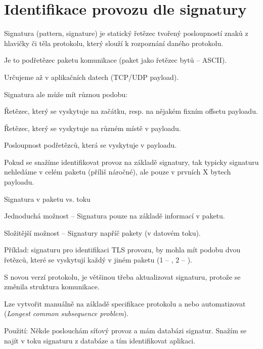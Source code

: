 
\section{Identifikace provozu dle signatury}


\begin{compactitem}
    \item Signatura (pattern, signature) je statický řetězec tvořený posloupností znaků z hlavičky či těla protokolu, který slouží k rozpoznání daného protokolu. \begin{compactitem}
        \item Je to  podřetězec paketu komunikace (paket jako řetězec bytů -- ASCII).
        \item Určujeme až v aplikačních datech (TCP/UDP payload).
    \end{compactitem}
    \item Signatura ale může mít různou podobu: \begin{compactitem}
        \item Řetězec, který se vyskytuje na začátku, resp. na nějakém fixním offsetu payloadu.
        \item Řetězec, který se vyskytuje na různém místě v payloadu.
        \item Posloupnost podřetězců, která se vyskytuje v payloadu.
    \end{compactitem}
    \item Pokud se snažíme identifikovat provoz na základě signatury, tak typicky signaturu nehledáme v celém paketu (příliš náročné), ale pouze v prvních X bytech payloadu.
    \item Signatura v paketu vs. toku \begin{compactitem}
        \item Jednoduchá možnost -- Signatura pouze na základě informací v paketu.
        \item Složitější možnost -- Signatury napříč pakety (v datovém toku). \begin{compactitem}
            \item Příklad: signaturu pro identifikaci TLS provozu, by mohla mít podobu dvou řetězců, které se vyskytují každý v jiném paketu (1 -- , 2 -- ).
        \end{compactitem}
    \end{compactitem}
    \item S novou verzí protokolu, je většinou třeba aktualizovat signaturu, protože se změnila struktura komunikace.
    \item Lze vytvořit manuálně na základě specifikace protokolu a nebo automatizovat (\textit{Longest common subsequence problem}).
    \item Použití: Někde poslouchám síťový provoz a mám databázi signatur. Snažím se najít v toku signaturu z databáze a tím identifikovat aplikaci.
\end{compactitem}

